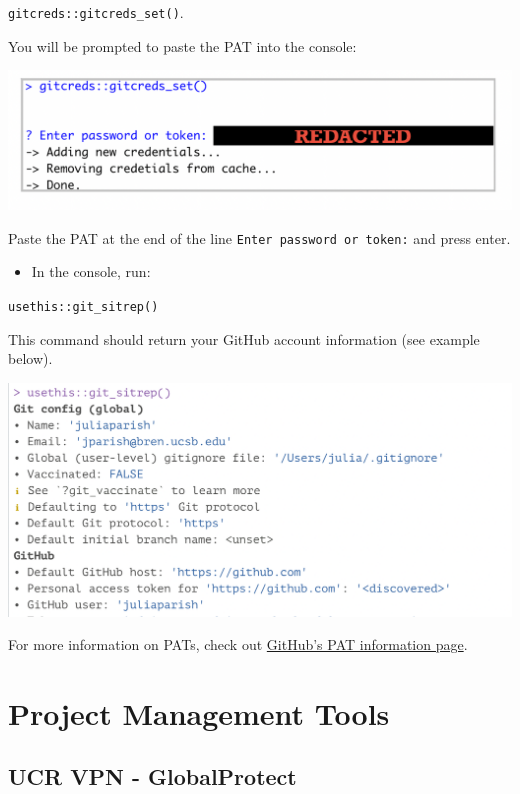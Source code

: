 \documentclass[
]{book}
\providecommand{\tightlist}{%
  \setlength{\itemsep}{0pt}\setlength{\parskip}{0pt}}
\begin{document}
\texttt{gitcreds::gitcreds\_set()}.

You will be prompted to paste the PAT into the console:

\begin{center}\includegraphics[width=0.8\linewidth]{images/paste_pat} \end{center}

Paste the PAT at the end of the line \texttt{Enter\ password\ or\ token:} and press enter.

\begin{itemize}
\tightlist
\item
  In the console, run:
\end{itemize}

\texttt{usethis::git\_sitrep()}

This command should return your GitHub account information (see example below).

\begin{center}\includegraphics[width=0.8\linewidth]{images/gitsitrep} \end{center}

For more information on PATs, check out \href{https://docs.github.com/en/authentication/keeping-your-account-and-data-secure/creating-a-personal-access-token}{GitHub's PAT information page}.

\hypertarget{projmgmt}{%
\chapter{Project Management Tools}\label{projmgmt}}

\hypertarget{ucr-vpn---globalprotect}{%
\section{UCR VPN - GlobalProtect}\label{ucr-vpn---globalprotect}}
\end{document}
